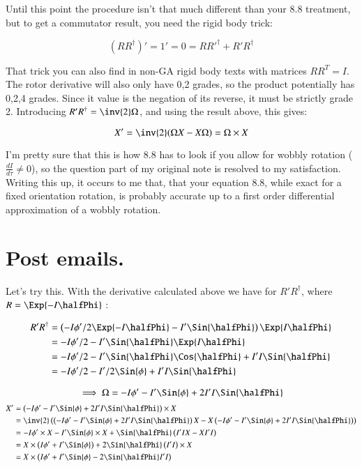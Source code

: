 \documentclass{article}      %
\begin{document}
Until this point the procedure isn't that much different than your 8.8 treatment, but to get a commutator result, you need the rigid body trick:

\[
(R R^\dagger)' = 1' = 0 = R {R'}^\dagger + R' R^\dagger
\]

That trick you can also find in non-GA rigid body texts with matrices $R R^T = I$.  The rotor derivative will also only have 0,2 grades, so the product potentially has 0,2,4 grades.  Since it value is the negation of its reverse, it must be strictly grade 2.  Introducing $R' R^\dagger = \inv{2} \Omega$, and using the result above, this gives:

\[
X' = \inv{2}(\Omega X - X \Omega) = \Omega \times X
\]


I'm pretty sure that this is how 8.8 has to look if you allow for wobbly rotation ($\frac{dI}{d\tau} \ne 0$), so the question part of my original note is resolved to my satisfaction.  Writing this up, it occurs to me that, that your equation 8.8, while exact for a fixed orientation rotation, is probably accurate up to a first order differential approximation of a wobbly rotation.

\section{Post emails. }

Let's try this.  With the derivative calculated above we have for $R'R^\dagger$, where $R = \Exp{-I \halfPhi}$ :

\begin{align*}
R'R^\dagger 
&= \left(-I \phi'/2 \Exp{ -I \halfPhi } - I' \Sin{\halfPhi} \right)\Exp{ I \halfPhi } \\ 
&= -I \phi'/2 - I' \Sin{\halfPhi} \Exp{ I \halfPhi } \\
&= -I \phi'/2 - I' \Sin{\halfPhi}\Cos{\halfPhi} + I'I \Sin{\halfPhi} \\
&= -I \phi'/2 - I'/2 \Sin{\phi} + I'I \Sin{\halfPhi} \\
\end{align*}

\[
\implies
\Omega = -I \phi' - I' \Sin{\phi} + 2 I'I \Sin{\halfPhi}
\]
\begin{align*}
X'
&= \left( -I \phi' - I' \Sin{\phi} + 2 I'I \Sin{\halfPhi} \right) \times X \\
&= \inv{2} \left( \left( -I \phi' - I' \Sin{\phi} + 2 I'I \Sin{\halfPhi} \right) X - X \left( -I \phi' - I' \Sin{\phi} + 2 I'I \Sin{\halfPhi} \right) \right) \\
&= -I \phi' \times X  - I'\Sin{\phi} \times X + \Sin{\halfPhi} \left( I'I X - X I' I \right)  \\
&= X \times \left(I \phi' + I'\Sin{\phi} \right ) + 2 \Sin{\halfPhi} \left( I'I \right) \times X \\
&= X \times \left(I \phi' + I'\Sin{\phi} - 2 \Sin{\halfPhi} I'I \right) \\
\end{align*}
\end{document}
